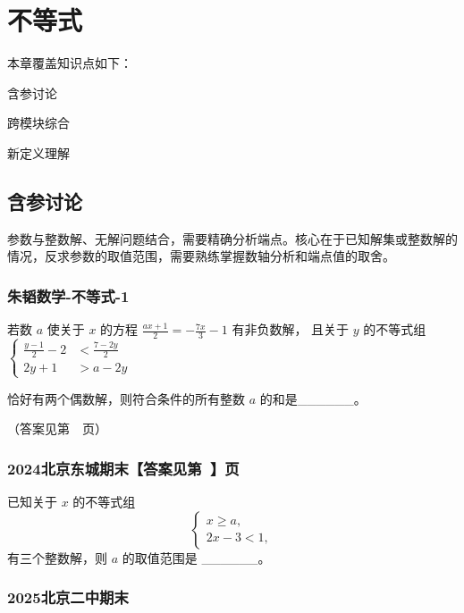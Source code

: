 \chapter{不等式}


本章覆盖知识点如下：
\begin{introduction}
  \item 含参讨论
  \item 跨模块综合
  \item 新定义理解
\end{introduction}

\section{含参讨论}

参数与整数解、无解问题结合，需要精确分析端点。核心在于已知解集或整数解的情况，反求参数的取值范围，需要熟练掌握数轴分析和端点值的取舍。

\subsection{朱韬数学-不等式-1}

若数 \(a\) 使关于 \(x\) 的方程 \(\displaystyle \frac{ax + 1}{2} = -\frac{7x}{3} - 1\) 有非负数解，
且关于 \(y\) 的不等式组 \(\displaystyle \left\{\begin{aligned} \frac{y - 1}{2} - 2 &< \frac{7 - 2y}{2} \\ 2y + 1 &> a - 2y \end{aligned}\right.\)

恰好有两个偶数解，则符合条件的所有整数 \(a\) 的和是\_\_\_\_\_\_。

（答案见第~\pageref{朱韬数学-不等式-1}~页）

\vspace{3cm}


\subsection{2024北京东城期末【答案见第~\pageref{2024北京东城期末}】页}

已知关于 \(x\) 的不等式组
\[
\begin{cases}
x \ge a, \\
2x - 3 < 1,
\end{cases}
\]
有三个整数解，则 \(a\) 的取值范围是 \_\_\_\_\_\_。

\vspace{3cm}



\subsection{2025北京二中期末}

